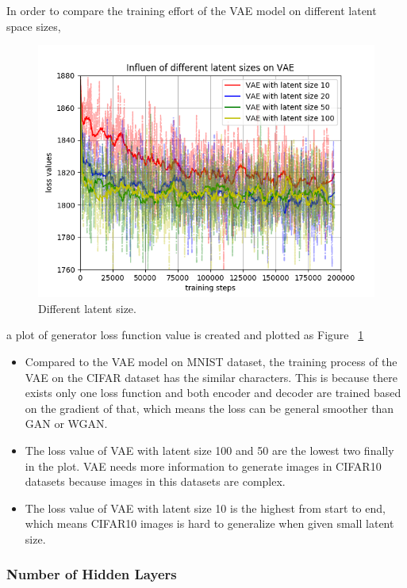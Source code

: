 \documentclass[12pt,letterpaper]{article}
\begin{document}


In order to compare the training effort of the VAE model on different latent space sizes,
\begin{figure}[h]
    \centering
    \includegraphics[width=.5\linewidth]{VAE_CIFAR_latents.png}
    \caption{\small Different latent size.}
    \label{fig:vae_latent_CIFAR}
\end{figure}

a plot of generator loss function value is created and plotted as Figure ~\ref{fig:vae_latent_CIFAR}


\begin{itemize}
    \item Compared to the VAE model on MNIST dataset, the training process of the VAE on the CIFAR dataset has the similar characters. This is because there exists only one loss function and both encoder and decoder are trained based on the gradient of that, which means the loss can be general smoother than GAN or WGAN.
    \item The loss value of VAE with latent size 100 and 50 are the lowest two finally in the plot. VAE needs more information to generate images in CIFAR10 datasets because images in this datasets are complex.
    \item The loss value of VAE with latent size 10 is the highest from start to end, which means CIFAR10 images is hard to generalize when given small latent size.
\end{itemize}

\subsubsection{Number of Hidden Layers}
\end{document}
